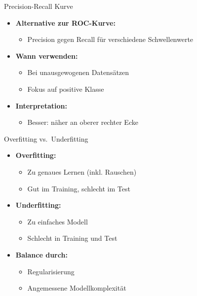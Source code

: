 \documentclass[
  ignorenonframetext,
]{beamer}
\providecommand{\tightlist}{%
  \setlength{\itemsep}{0pt}\setlength{\parskip}{0pt}}
\begin{document}
\begin{frame}{Precision-Recall Kurve}
\protect{}\label{precision-recall-kurve}
\begin{itemize}
\tightlist
\item
  \textbf{Alternative zur ROC-Kurve:}

  \begin{itemize}
  \tightlist
  \item
    Precision gegen Recall für verschiedene Schwellenwerte
  \end{itemize}
\item
  \textbf{Wann verwenden:}

  \begin{itemize}
  \tightlist
  \item
    Bei unausgewogenen Datensätzen
  \item
    Fokus auf positive Klasse
  \end{itemize}
\item
  \textbf{Interpretation:}

  \begin{itemize}
  \tightlist
  \item
    Besser: näher an oberer rechter Ecke
  \end{itemize}
\end{itemize}
\end{frame}

\begin{frame}{Overfitting vs.~Underfitting}
\protect{}\label{overfitting-vs.-underfitting}
\begin{itemize}
\tightlist
\item
  \textbf{Overfitting:}

  \begin{itemize}
  \tightlist
  \item
    Zu genaues Lernen (inkl. Rauschen)
  \item
    Gut im Training, schlecht im Test
  \end{itemize}
\item
  \textbf{Underfitting:}

  \begin{itemize}
  \tightlist
  \item
    Zu einfaches Modell
  \item
    Schlecht in Training und Test
  \end{itemize}
\item
  \textbf{Balance durch:}

  \begin{itemize}
  \tightlist
  \item
    Regularisierung
  \item
    Angemessene Modellkomplexität
  \end{itemize}
\end{itemize}
\end{frame}
\end{document}
